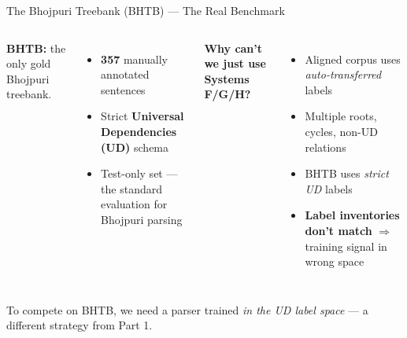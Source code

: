 \documentclass[aspectratio=169,10pt]{beamer}
\newcommand{\bho}{Bhojpuri}
\newcommand{\hi}{Hindi}
\begin{document}
\begin{frame}{The \bho{} Treebank (BHTB) --- The Real Benchmark}
\begin{columns}[T]
\textbf{BHTB:} the only gold \bho{} treebank.
\begin{itemize}
  \item \textbf{357} manually annotated sentences
  \item Strict \textbf{Universal Dependencies (UD)} schema
  \item Test-only set --- the standard evaluation for \bho{} parsing
\end{itemize}

\vspace{0.3cm}
\textbf{Why can't we just use Systems F/G/H?}
\begin{itemize}
  \item Aligned corpus uses \emph{auto-transferred} labels
  \item Multiple roots, cycles, non-UD relations
  \item BHTB uses \emph{strict UD} labels
  \item \textbf{Label inventories don't match} $\Rightarrow$ training signal in wrong space
\end{itemize}

\centering
{}
\end{columns}

\vspace{0.4cm}
\centering
\colorbox{yellow!30}{\parbox{0.85\textwidth}{\centering\small
To compete on BHTB, we need a parser trained \emph{in the UD label space} --- a different strategy from Part 1.
}}
\end{frame}
\end{document}
